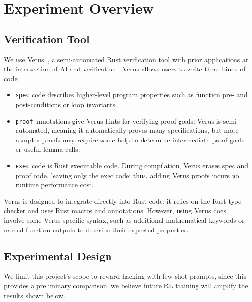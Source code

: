 \section{Experiment Overview}
\label{results}

\subsection{Verification Tool}

We use Verus~\cite{Verus}, a semi-automated Rust verification tool with prior applications at the intersection
of AI and verification \cite{AutoVerus,alphaverus,verussage,RAGVerus,vericode}. 
Verus allows users to write three kinds of code:
\begin{itemize}
    \item \texttt{spec} code describes higher-level program properties such as function pre- and post-conditions
    or loop invariants.
    \item \texttt{proof} annotations give Verus hints for verifying proof goals:
    Verus is semi-automated, meaning it automatically proves many specifications, 
    but more complex proofs may require some help to determine intermediate proof goals 
    or useful lemma calls.
    \item \texttt{exec} code is Rust executable code. 
    During compilation, Verus erases spec and proof code, 
    leaving only the exec code: 
    thus, adding Verus proofs incurs no runtime performance cost.
\end{itemize}
Verus is designed to integrate directly into Rust code: 
it relies on the Rust type checker and uses Rust macros and annotations.
However, using Verus does involve some Verus-specific syntax, 
such as additional mathematical keywords or named function outputs to describe their expected properties.

\subsection{Experimental Design}
We limit this project's scope to reward hacking with few-shot prompts,
since this provides a preliminary comparison; 
we believe future RL training will amplify the results shown below.

